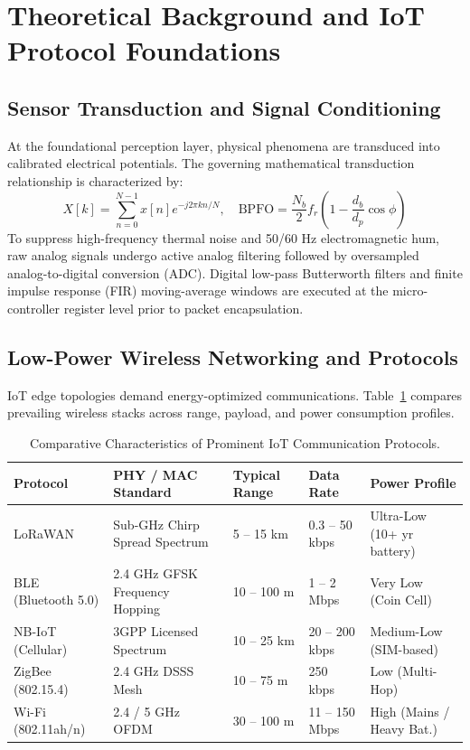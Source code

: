 \section{Theoretical Background and IoT Protocol Foundations}

\subsection{Sensor Transduction and Signal Conditioning}
At the foundational perception layer, physical phenomena are transduced into calibrated electrical potentials. The governing mathematical transduction relationship is characterized by:
\begin{equation}
  X[k] = \sum_{n=0}^{N-1} x[n] e^{-j 2\pi k n / N}, \quad \text{BPFO} = \frac{N_b}{2} f_r \left(1 - \frac{d_b}{d_p} \cos \phi\right)
\label{eq:core_math}
\end{equation}
To suppress high-frequency thermal noise and 50/60 Hz electromagnetic hum, raw analog signals undergo active analog filtering followed by oversampled analog-to-digital conversion (ADC). Digital low-pass Butterworth filters and finite impulse response (FIR) moving-average windows are executed at the micro-controller register level prior to packet encapsulation.

\subsection{Low-Power Wireless Networking and Protocols}
IoT edge topologies demand energy-optimized communications. Table~\ref{tab:proto_comp} compares prevailing wireless stacks across range, payload, and power consumption profiles.
\begin{table}[H]
\centering
\caption{Comparative Characteristics of Prominent IoT Communication Protocols.}
\label{tab:proto_comp}
\begin{tabularx}{\linewidth}{lXXXX}
\toprule
\textbf{Protocol} & \textbf{PHY / MAC Standard} & \textbf{Typical Range} & \textbf{Data Rate} & \textbf{Power Profile} \\
\midrule
LoRaWAN & Sub-GHz Chirp Spread Spectrum & 5 -- 15 km & 0.3 -- 50 kbps & Ultra-Low (10+ yr battery) \\
BLE (Bluetooth 5.0) & 2.4 GHz GFSK Frequency Hopping & 10 -- 100 m & 1 -- 2 Mbps & Very Low (Coin Cell) \\
NB-IoT (Cellular) & 3GPP Licensed Spectrum & 10 -- 25 km & 20 -- 200 kbps & Medium-Low (SIM-based) \\
ZigBee (802.15.4) & 2.4 GHz DSSS Mesh & 10 -- 75 m & 250 kbps & Low (Multi-Hop) \\
Wi-Fi (802.11ah/n) & 2.4 / 5 GHz OFDM & 30 -- 100 m & 11 -- 150 Mbps & High (Mains / Heavy Bat.) \\
\bottomrule
\end{tabularx}
\end{table}

